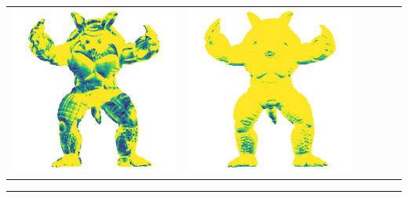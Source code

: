 \begin{tabularx}{\linewidth}{@{}Y@{}Y@{}Y@{}Y@{}Y@{}Y@{}}
\includegraphics[width=\linewidth]{semisynthetic/20150514_22_marrnet_err.png} &
\includegraphics[width=\linewidth]{semisynthetic/20150514_22_ef_err.png} \\
\end{tabularx}
\begin{center}\rule{0.5\linewidth}{\linethickness}\end{center}

